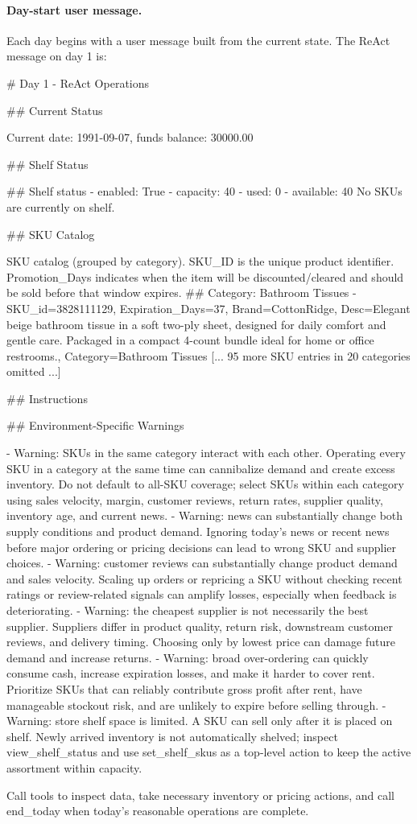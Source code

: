 \paragraph{Day-start user message.}
Each day begins with a user message built from the current state. The ReAct message on day 1 is:
\begin{PromptBox}
# Day 1 - ReAct Operations

## Current Status

Current date: 1991-09-07, funds balance: 30000.00

## Shelf Status

## Shelf status
- enabled: True
- capacity: 40
- used: 0
- available: 40
No SKUs are currently on shelf.

## SKU Catalog

SKU catalog (grouped by category). SKU_ID is the unique product identifier. Promotion_Days indicates when the item will be discounted/cleared and should be sold before that window expires.
## Category: Bathroom Tissues
- SKU_id=3828111129, Expiration_Days=37, Brand=CottonRidge, Desc=Elegant beige bathroom tissue in a soft two-ply sheet, designed for daily comfort and gentle care. Packaged in a compact 4-count bundle ideal for home or office restrooms., Category=Bathroom Tissues
[... 95 more SKU entries in 20 categories omitted ...]

## Instructions

## Environment-Specific Warnings

- Warning: SKUs in the same category interact with each other. Operating every SKU in a category at the same time can cannibalize demand and create excess inventory. Do not default to all-SKU coverage; select SKUs within each category using sales velocity, margin, customer reviews, return rates, supplier quality, inventory age, and current news.
- Warning: news can substantially change both supply conditions and product demand. Ignoring today's news or recent news before major ordering or pricing decisions can lead to wrong SKU and supplier choices.
- Warning: customer reviews can substantially change product demand and sales velocity. Scaling up orders or repricing a SKU without checking recent ratings or review-related signals can amplify losses, especially when feedback is deteriorating.
- Warning: the cheapest supplier is not necessarily the best supplier. Suppliers differ in product quality, return risk, downstream customer reviews, and delivery timing. Choosing only by lowest price can damage future demand and increase returns.
- Warning: broad over-ordering can quickly consume cash, increase expiration losses, and make it harder to cover rent. Prioritize SKUs that can reliably contribute gross profit after rent, have manageable stockout risk, and are unlikely to expire before selling through.
- Warning: store shelf space is limited. A SKU can sell only after it is placed on shelf. Newly arrived inventory is not automatically shelved; inspect view_shelf_status and use set_shelf_skus as a top-level action to keep the active assortment within capacity.

Call tools to inspect data, take necessary inventory or pricing actions, and call end_today when today's reasonable operations are complete.
\end{PromptBox}


